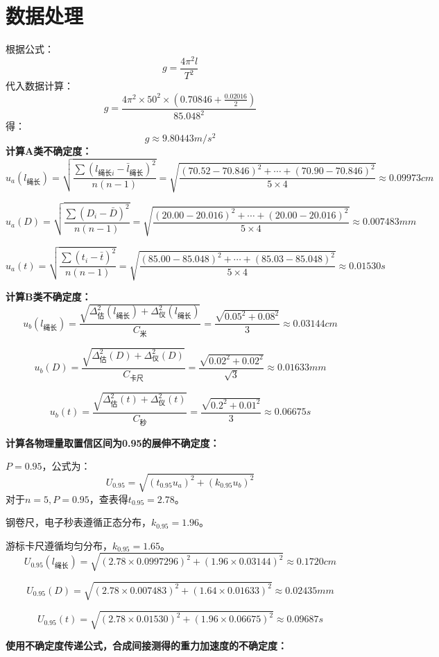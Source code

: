 \documentclass[12pt,a4paper]{article}
\begin{document}
	\section{数据处理}
	根据公式：\[ g = \frac{4\pi^2 l}{T^2} \]
	代入数据计算：\[ g = \frac{4\pi^2 \times 50^2 \times (0.70846 + \frac{0.02016}{2}) } {85.048^2} \]
	得：\[ g \approx 9.80443 m/s^2  \]
	\textbf{计算A类不确定度：}
	\[ u_a(l_{\text{绳长}}) = \sqrt{\frac{\sum(l_{\text{绳长}i} - \bar{l}_{\text{绳长}})^2}{n(n-1)}} = \sqrt{\frac{(70.52 - 70.846)^2 + \cdots + (70.90 - 70.846)^2}{5 \times 4}} \approx 0.09973cm \] 
	
	\[ u_a(D) = \sqrt{\frac{\sum(D_i - \bar{D})^2}{n(n-1)}} = \sqrt{\frac{(20.00 - 20.016)^2 + \cdots + (20.00 - 20.016)^2}{5 \times 4}} \approx 0.007483mm \]
	
	\[ u_a(t) = \sqrt{\frac{\sum(t_i - \bar{t})^2}{n(n-1)}} = \sqrt{\frac{(85.00 - 85.048)^2 + \cdots + (85.03 - 85.048)^2}{5 \times 4}} \approx 0.01530s \]
	
	\textbf{计算B类不确定度：}
	\[ u_b(l_{\text{绳长}}) = \frac{\sqrt{\Delta^{2}_{\text{估}}(l_{\text{绳长}}) + \Delta^{2}_{\text{仪}}(l_{\text{绳长}})}}{C_\text{米}}  = \frac{\sqrt{0.05^2 + 0.08^2}}{3} \approx 0.03144cm \]
	
	\[ u_b(D) = \frac{\sqrt{\Delta^{2}_{\text{估}}(D) + \Delta^{2}_{\text{仪}}(D)}}{C_\text{卡尺}}  = \frac{\sqrt{0.02^2 + 0.02^2}}{\sqrt{3}} \approx 0.01633mm \]
	
	\[ u_b(t) = \frac{\sqrt{\Delta^{2}_{\text{估}}(t) + \Delta^{2}_{\text{仪}}(t)}}{C_\text{秒}}  = \frac{\sqrt{0.2^2 + 0.01^2}}{3} \approx 0.06675s \]
	
	\textbf{计算各物理量取置信区间为0.95的展伸不确定度：}
	
	$P=0.95$，公式为：
	\[ U_{0.95} = \sqrt{(t_{0.95}u_a)^2 + (k_{0.95}u_b)^2} \]
	对于$n=5,P=0.95$，查表得$t_{0.95}=2.78$。
	
	钢卷尺，电子秒表遵循正态分布，$k_{0.95} = 1.96$。
	
	游标卡尺遵循均匀分布，$k_{0.95} = 1.65$。
	\[ U_{0.95}(l_{\text{绳长}}) = \sqrt{(2.78\times 0.0997296)^2 + (1.96\times 0.03144)^2} \approx 0.1720cm  \]
	
	\[ U_{0.95}(D) = \sqrt{(2.78\times 0.007483)^2 + (1.64\times 0.01633)^2} \approx 0.02435mm  \]
	
	\[ U_{0.95}(t) = \sqrt{(2.78\times 0.01530)^2 + (1.96\times 0.06675)^2} \approx 0.09687s  \]
	
	\textbf{使用不确定度传递公式，合成间接测得的重力加速度的不确定度：}
	
\end{document}
